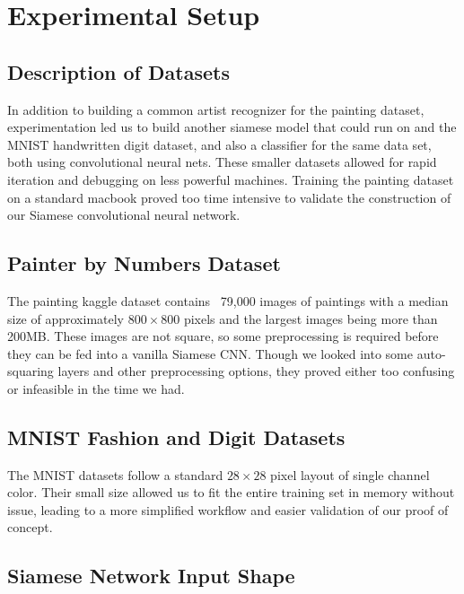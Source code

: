 \documentclass[a4paper, 11pt]{article}
\begin{document}
\section{Experimental Setup}

\subsection{Description of Datasets}

In addition to building a common artist recognizer for the painting dataset, experimentation led us to build another siamese model that could run on  and the MNIST handwritten digit dataset, and also a classifier for the same data set, both using convolutional neural nets. These smaller datasets allowed for rapid iteration and debugging on less powerful machines. Training the painting dataset on a standard macbook proved too time intensive to validate the construction of our Siamese convolutional neural network.

\subsection{Painter by Numbers Dataset}

The painting kaggle dataset contains ~79,000 images of paintings with a median size of approximately $800 \times 800$ pixels and the largest images being more than 200MB. These images are not square, so some preprocessing is required before they can be fed into a vanilla Siamese CNN. Though we looked into some auto-squaring layers and other preprocessing options, they proved either too confusing or infeasible in the time we had. 

\subsection{MNIST Fashion and Digit Datasets}

The MNIST datasets follow a standard $28 \times 28$ pixel layout of single channel color. Their small size allowed us to fit the entire training set in memory without issue, leading to a more simplified workflow and easier validation of our proof of concept.


\subsection{Siamese Network Input Shape}
\end{document}
